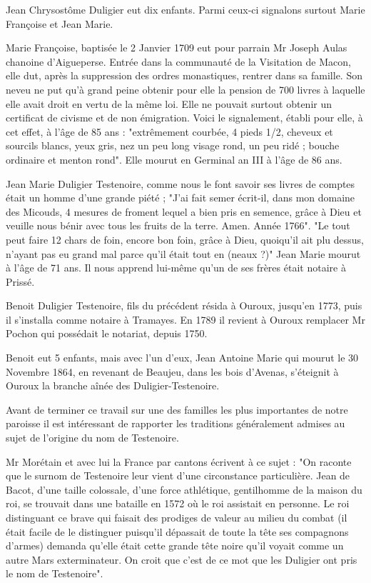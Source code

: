 Jean Chrysostôme Duligier eut dix enfants. Parmi ceux-ci signalons surtout Marie Françoise et Jean Marie.

Marie Françoise, baptisée le 2 Janvier 1709 eut pour parrain Mr Joseph Aulas chanoine d'Aigueperse. Entrée dans la communauté de la Visitation de Macon, elle dut, après la suppression des ordres monastiques, rentrer dans sa famille. Son neveu ne put qu'à grand peine obtenir pour elle la pension de 700 livres à laquelle elle avait droit en vertu de la même loi. Elle ne pouvait surtout obtenir un certificat de civisme et de non émigration. Voici le signalement, établi pour elle, à cet effet, à l'âge de 85 ans : "extrêmement courbée, 4 pieds 1/2, cheveux et sourcils blancs, yeux gris, nez un peu long visage rond, un peu ridé ; bouche ordinaire et menton rond". Elle mourut en Germinal an III à l'âge de 86 ans.

Jean Marie Duligier Testenoire, comme nous le font savoir ses livres de comptes était un homme d'une grande piété ; "J'ai fait semer écrit-il, dans mon domaine des Micouds, 4 mesures de froment lequel a bien pris en semence, grâce à Dieu et veuille nous bénir avec tous les fruits de la terre. Amen. Année 1766". "Le tout peut faire 12 chars de foin, encore bon foin, grâce à Dieu, quoiqu'il ait plu dessus, n'ayant pas eu grand mal parce qu'il était tout en (neaux ?)" Jean Marie mourut à l'âge de 71 ans. Il nous apprend lui-même qu'un de ses frères était notaire à Prissé.

Benoit Duligier Testenoire, fils du précédent résida à Ouroux, jusqu'en 1773, puis il s'installa comme notaire à Tramayes. En 1789 il revient à Ouroux remplacer Mr Pochon qui possédait le notariat, depuis 1750.

Benoit eut 5 enfants, mais avec l'un d'eux, Jean Antoine Marie qui mourut le 30 Novembre 1864, en revenant de Beaujeu, dans les bois d'Avenas, s'éteignit à Ouroux la branche aînée des Duligier-Testenoire.

Avant de terminer ce travail sur une des familles les plus importantes
de notre paroisse il est intéressant de rapporter les traditions généralement admises au sujet de l'origine du nom de Testenoire.

Mr Morétain et avec lui la France par cantons écrivent à ce sujet : "On raconte que le surnom de Testenoire leur vient d'une circonstance particulière. Jean de Bacot, d'une taille colossale, d'une force athlétique, gentilhomme de la maison du roi, se trouvait dans une bataille en 1572 où le roi assistait en personne. Le roi distinguant ce brave qui faisait des prodiges de valeur au milieu du combat (il était facile de le distinguer puisqu'il dépassait de toute la tête ses compagnons d'armes) demanda qu'elle était cette grande tête noire qu'il voyait comme un autre Mars exterminateur. On croit que c'est de ce mot que les Duligier ont pris le nom de Testenoire".

